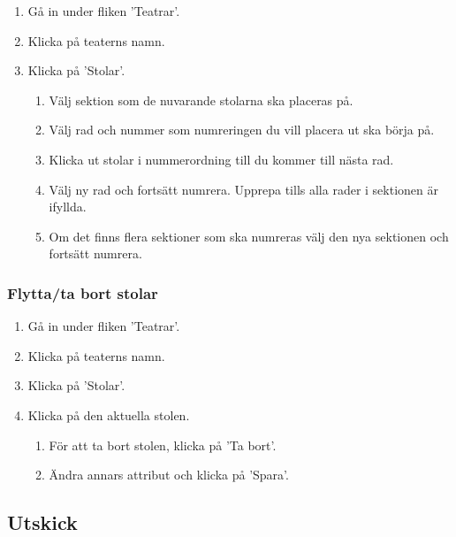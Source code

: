 \documentclass[a4paper, twoside, 11pt, titlepage]{article}
\begin{document}
		\begin{enumerate}
		\item Gå in under fliken 'Teatrar'.

		\item Klicka på teaterns namn.

		\item Klicka på 'Stolar'.

		\begin{enumerate}
		\item Välj sektion som de nuvarande stolarna ska placeras på.

		\item Välj rad och nummer som numreringen du vill placera ut ska börja på.

		\item Klicka ut stolar i nummerordning till du kommer till nästa rad.

		\item Välj ny rad och fortsätt numrera. Upprepa tills alla rader i sektionen är ifyllda.

		\item Om det finns flera sektioner som ska numreras välj den nya sektionen och fortsätt numrera.
		\end{enumerate}
		\end{enumerate}

		\subsubsection{Flytta/ta bort stolar}


		\begin{enumerate}
		\item Gå in under fliken 'Teatrar'.

		\item Klicka på teaterns namn.

		\item Klicka på 'Stolar'.

		\item Klicka på den aktuella stolen.

		\begin{enumerate}
		\item För att ta bort stolen, klicka på 'Ta bort'.

		\item Ändra annars attribut och klicka på 'Spara'.
		\end{enumerate}
		\end{enumerate}

	\subsection{Utskick}
\end{document}
